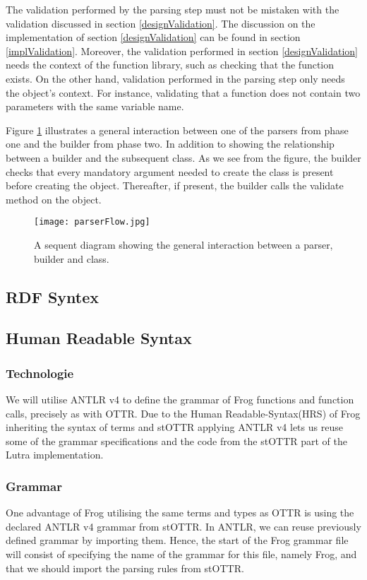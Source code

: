 \para
The validation performed by the parsing step must not be mistaken with the validation discussed in section \ref{designValidation}. The discussion on the implementation of section \ref{designValidation} can be found in section \ref{implValidation}. Moreover, the validation performed in section \ref{designValidation} needs the context of the function library, such as checking that the function exists. On the other hand, validation performed in the parsing step only needs the object's context. For instance, validating that a function does not contain two parameters with the same variable name. 

\para
Figure \ref{fig:parserFlow} illustrates a general interaction between one of the parsers from phase one and the builder from phase two. In addition to showing the relationship between a builder and the subsequent class. As we see from the figure, the builder checks that every mandatory argument needed to create the class is present before creating the object. Thereafter, if present, the builder calls the validate method on the object. 

\begin{figure}
  \centering
  \texttt{[image: parserFlow.jpg]}
  \caption{A sequent diagram showing the general interaction between a parser, builder and class. }
  \label{fig:parserFlow}
\end{figure}

\subsection{RDF Syntex}
\label{implRDF}

\subsection{Human Readable Syntax}
\label{implHRS}
\subsubsection{Technologie}
We will utilise ANTLR v4 to define the grammar of Frog functions and function calls, precisely as with OTTR.  Due to the Human Readable-Syntax(HRS) of Frog inheriting the syntax of terms and stOTTR applying ANTLR v4 lets us reuse some of the grammar specifications and the code from the stOTTR part of the Lutra implementation. 

\subsubsection{Grammar}
One advantage of Frog utilising the same terms and types as OTTR is using the declared ANTLR v4 grammar from stOTTR. In ANTLR, we can reuse previously defined grammar by importing them. Hence, the start of the Frog grammar file will consist of specifying the name of the grammar for this file, namely Frog, and that we should import the parsing rules from stOTTR. 

